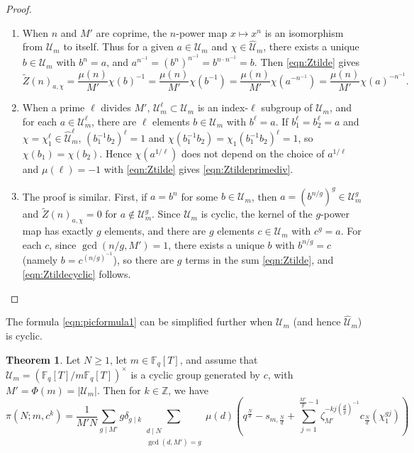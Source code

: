 \documentclass[10pt,reqno]{amsproc}
\newcommand{\what}[1]{\widehat{#1}}
\newcommand{\bF}{\mathbb{F}}
\newcommand{\bZ}{\mathbb{Z}}
\newcommand{\scU}{\mathscr{U}}
\newcommand{\1}{\mathds{1}}	%
\theoremstyle{definition}
\newtheorem{theorem}{Theorem}[section]
\theoremstyle{remark}
\begin{document}
\begin{proof}
\begin{enumerate}
    \item When $n$ and $M'$ are coprime, the $n$-power map $x \mapsto x^n$ is an isomorphism from $\scU_m$ to itself.
    Thus for a given $a \in \scU_m$ and $\chi \in \what{\scU}_m$, there exists a unique $b \in \scU_m$ with $b^n = a$, and $a^{n^{-1}} = (b^n)^{n^{-1}} = b^{n \cdot n^{-1}} = b$.
    Then \eqref{eqn:Ztilde} gives
    \[
        \widetilde{Z}(n)_{a, \chi} = \frac{\mu(n)}{M'} \chi(b)^{-1} = \frac{\mu(n)}{M'} \chi(b^{-1}) = \frac{\mu(n)}{M'} \chi(a^{-n^{-1}}) = \frac{\mu(n)}{M'} \chi(a)^{-n^{-1}}.
    \]
    \item When a prime $\ell$ divides $M'$, $\scU_m^\ell \subset \scU_m$ is an index-$\ell$ subgroup of $\scU_m$, and for each $a \in \scU_m^\ell$, there are $\ell$ elements $b \in \scU_m$ with $b^\ell = a$.
    If $b_1^\ell = b_2^\ell = a$ and $\chi = \chi_1^\ell \in \what{\scU}_m^\ell$, $(b_1^{-1} b_2)^{\ell} = 1$ and $\chi(b_1^{-1} b_2) = \chi_1(b_1^{-1}b_2)^\ell = 1$, so $\chi(b_1) = \chi(b_2)$.
    Hence $\chi(a^{1/\ell})$ does not depend on the choice of $a^{1/\ell}$ and $\mu(\ell) = -1$ with \eqref{eqn:Ztilde} gives \eqref{eqn:Ztildeprimediv}.
    \item The proof is similar.
    First, if $a = b^n$ for some $b \in \scU_m$, then $a = (b^{n/g})^g \in \scU_m^g$ and $\widetilde{Z}(n)_{a, \chi} = 0$ for $a \not \in \scU_m^g$.
    Since $\scU_m$ is cyclic, the kernel of the $g$-power map has exactly $g$ elements, and there are $g$ elements $c \in \scU_m$ with $c^g = a$.
    For each $c$, since $\gcd(n/g, M') = 1$, there exists a unique $b$ with $b^{n/g} = c$ (namely $b = c^{(n/g)^{-1}}$), so there are $g$ terms in the sum \eqref{eqn:Ztilde}, and \eqref{eqn:Ztildecyclic} follows.
\end{enumerate}
\end{proof}

The formula \eqref{eqn:picformula1} can be simplified further when $\scU_m$ (and hence $\what{\scU}_m$) is cyclic.

\begin{theorem}
    \label{thm:picformula_cyclic}
    Let $N \ge 1$, let $m \in \bF_q[T]$, and assume that $\scU_m = (\bF_q[T] / m \bF_q[T])^\times$ is a cyclic group generated by $c$, with $M' = \Phi(m) = |\scU_m|$.
    Then for $k \in \bZ$, we have
    \begin{equation}
        \label{eqn:piformula_cyclic}
        \pi(N; m, c^k) = \frac{1}{M'N} \sum_{g \mid M'} g \delta_{g \mid k} \sum_{\substack{d \mid N \\ \gcd(d, M') = g}} \mu(d) \left(q^{\frac{N}{d}} - s_{m, \frac{N}{d}} + \sum_{j=1}^{\frac{M'}{g} - 1} \zeta_{M'}^{-kj\left(\frac{d}{g}\right)^{-1}} c_{\frac{N}{d}}(\chi_1^{gj})\right)
    \end{equation}
\end{theorem}
\end{document}

